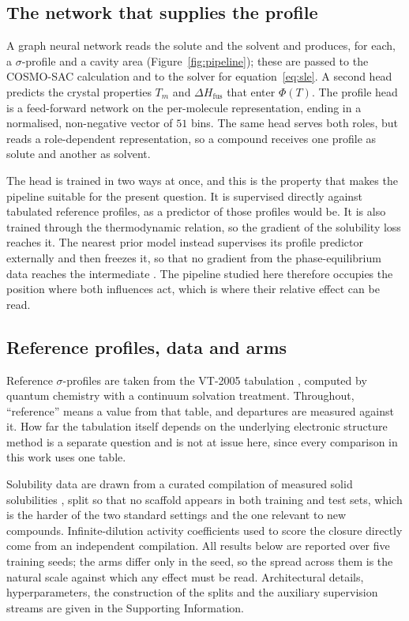 \subsection{The network that supplies the profile}

A graph neural network reads the solute and the solvent and produces, for each, a $\sigma$-profile
and a cavity area (Figure~\ref{fig:pipeline}); these are passed to the COSMO-SAC calculation and to the solver for
equation~\eqref{eq:sle}. A second head predicts the crystal properties $T_m$ and
$\Delta H_{\mathrm{fus}}$ that enter $\Phi(T)$. The profile head is a feed-forward network on the per-molecule representation, ending in a normalised, non-negative vector of $51$ bins. The same head serves both roles, but reads a role-dependent representation, so a compound receives one profile as solute and another as solvent.

The head is trained in two ways at once, and this is the property that makes the pipeline suitable
for the present question. It is supervised directly against tabulated reference profiles, as a
predictor of those profiles would be. It is also trained through the thermodynamic relation, so
the gradient of the solubility loss reaches it. The nearest prior model instead supervises its
profile predictor externally and then freezes it, so that no gradient from the phase-equilibrium
data reaches the intermediate \cite{yang2025tennet}. The pipeline studied here therefore occupies
the position where both influences act, which is where their relative effect can be read.

\subsection{Reference profiles, data and arms}

Reference $\sigma$-profiles are taken from the VT-2005 tabulation \cite{mullins2006}, computed by
quantum chemistry with a continuum solvation treatment. Throughout, ``reference'' means a value
from that table, and departures are measured against it. How far the tabulation itself depends on
the underlying electronic structure method is a separate question \cite{salih2025sigma} and is not
at issue here, since every comparison in this work uses one table.

Solubility data are drawn from a curated compilation of measured solid solubilities
\cite{krasnov2025bigsoldb}, split so that no scaffold \cite{bemis1996} appears in both training and
test sets, which is the harder of the two standard settings and the one relevant to new compounds.
Infinite-dilution activity coefficients used to score the closure directly come from an independent
compilation. All results below are reported over five training seeds; the arms differ only in the
seed, so the spread across them is the natural scale against which any effect must be read.
Architectural details, hyperparameters, the construction of the splits and the auxiliary
supervision streams are given in the Supporting Information.

